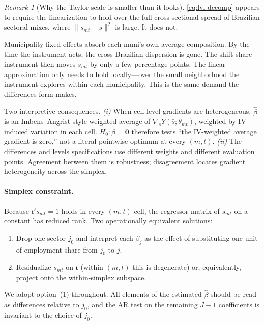 \documentclass{article}
\newcommand{\bzero}{\mathbf{0}}
\newcommand{\iotaVec}{\boldsymbol{\iota}}
\theoremstyle{plain}
\theoremstyle{definition}
\theoremstyle{remark}
\newtheorem{remark}{Remark}
\begin{document}
\begin{remark}[Why the Taylor scale is smaller than it looks]\label{rem:late}
\eqref{eq:lvl-decomp} appears to require the linearization to hold over the
full cross-sectional spread of Brazilian sectoral mixes, where
$\|s_{mt}-\bar s\|^{2}$ is large. It does not.

Municipality fixed effects absorb each muni's own average composition.
By the time the instrument acts, the cross-Brazilian dispersion is gone.
The shift-share instrument then moves $s_{mt}$ by only a few percentage
points. The linear approximation only needs to hold locally---over the
small neighborhood the instrument explores within each municipality. This
is the same demand the differences form makes.

Two interpretive consequences. \emph{(i)} When cell-level gradients are
heterogeneous, $\hat\beta$ is an Imbens--Angrist-style weighted average of
$\nabla_{s} Y(\bar s;\theta_{mt})$, weighted by IV-induced variation in
each cell. $H_{0}:\beta=\bzero$ therefore tests ``the IV-weighted average
gradient is zero,'' not a literal pointwise optimum at every $(m,t)$.
\emph{(ii)} The differences and levels specifications use different weights
and different evaluation points. Agreement between them is robustness;
disagreement locates gradient heterogeneity across the simplex.
\end{remark}

\paragraph{Simplex constraint.}
Because $\iotaVec' s_{mt}=1$ holds in every $(m,t)$ cell, the regressor matrix
of $s_{mt}$ on a constant has reduced rank. Two operationally equivalent
solutions:
\begin{enumerate}[leftmargin=*,nosep]
  \item Drop one sector $j_0$
    and interpret each $\beta_j$ as the effect of substituting one unit of
    employment share from $j_0$ to $j$.
  \item Residualize $s_{mt}$ on $\iotaVec$ (within $(m,t)$ this is degenerate)
    or, equivalently, project onto the within-simplex subspace.
\end{enumerate}
We adopt option~(1) throughout. All elements of the estimated $\hat\beta$
should be read as differences relative to $j_0$, and the AR test on the
remaining $J-1$ coefficients is invariant to the choice of $j_0$.


\end{document}
